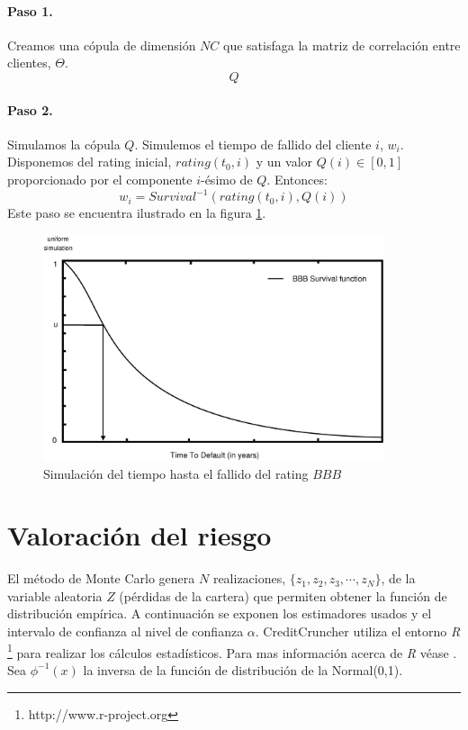 \paragraph{Paso 1.} Creamos una c\'opula de dimensi\'on $NC$ que satisfaga la
matriz de correlaci\'on entre clientes, $\Theta$.
\begin{displaymath}
Q
\end{displaymath}

\paragraph{Paso 2.} Simulamos la c\'opula $Q$. Simulemos el tiempo de fallido del
cliente $i$, $w_i$. Disponemos del rating inicial, $rating(t_0,i)$ y un valor
$Q(i) \in [0,1]$ proporcionado por el componente $i$-\'esimo de $Q$. Entonces:
\begin{displaymath}
w_i = Survival^{-1}(rating(t_0,i),Q(i))
\end{displaymath}
Este paso se encuentra ilustrado en la figura \ref{simttd}.

\begin{figure}[!hb]
\begin{center}
\includegraphics[width=10cm,angle=0]{./images/simttd.eps}
\caption{Simulaci\'on del tiempo hasta el fallido del rating $BBB$}
\label{simttd}
\end{center}
\end{figure}



\section{Valoraci\'on del riesgo}

El m\'etodo de Monte Carlo genera $N$ realizaciones, $\{z_1,z_2,z_3,\cdots,z_N\}$,
de la variable aleatoria $Z$ (p\'erdidas de la cartera) que permiten obtener la
funci\'on de distribuci\'on emp\'irica. A continuaci\'on se exponen los estimadores
usados y el intervalo de confianza al nivel de confianza $\alpha$. CreditCruncher
utiliza el entorno \emph{R} \footnote{http://www.r-project.org} para realizar los
c\'alculos estad\'isticos. Para mas informaci\'on acerca de \emph{R} v\'ease \cite{stats:R}.
Sea $\phi^{-1}(x)$ la inversa de la funci\'on de distribuci\'on de la Normal(0,1).

